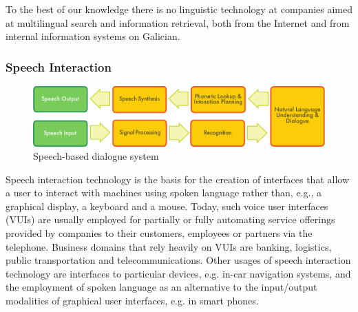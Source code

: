 \begin{multicols}{2}
\begin{itemize}
\begin{multicols}{2}

To the best of our knowledge there is no linguistic technology at companies aimed at multilingual search and information retrieval, both from the Internet and from internal information systems on Galician.  


\subsubsection{Speech Interaction}

\begin{figure}[htb]
  \center
  \includegraphics[width=\textwidth]{../_media/english/simple_speech-based_dialogue_architecture}
  \caption{Speech-based dialogue system}
  \label{fig:dialoguearch_en}
\end{figure}

Speech interaction technology is the basis for the creation of interfaces that allow a user to interact with machines using spoken language rather than, e.g., a graphical display, a keyboard and a mouse. Today, such voice user interfaces (VUIs) are usually employed for partially or fully automating service offerings provided by companies to their customers, employees or partners via the telephone. Business domains that rely heavily on VUIs are banking, logistics, public transportation and telecommunications. Other usages of speech interaction technology are interfaces to particular devices, e.g. in-car navigation systems, and the employment of spoken language as an alternative to the input/output modalities of graphical user interfaces, e.g. in smart phones.


\end{multicols}
\end{itemize}
\end{multicols}
